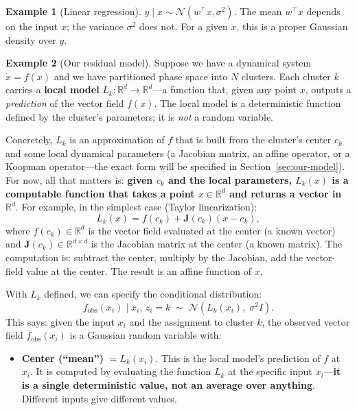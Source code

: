 \documentclass[11pt]{article}
\theoremstyle{definition}
\newtheorem{example}{Example}[section]
\theoremstyle{plain}
\theoremstyle{remark}
\newcommand{\R}{\mathbb{R}}
\newcommand{\Jv}{\boldsymbol{J}}
\begin{document}
\begin{example}[Linear regression]
$y\mid x \sim \mathcal{N}(w^\top x, \sigma^2)$. The mean $w^\top x$ depends on the input $x$; the variance $\sigma^2$ does not. For a given $x$, this is a proper Gaussian density over $y$.
\end{example}

\begin{example}[Our residual model]
Suppose we have a dynamical system $\dot{x}=f(x)$ and we have partitioned phase space into $N$ clusters. Each cluster $k$ carries a \textbf{local model} $L_k\colon\R^d\to\R^d$---a function that, given any point $x$, outputs a \emph{prediction} of the vector field $f(x)$. The local model is a deterministic function defined by the cluster's parameters; it is \emph{not} a random variable.

Concretely, $L_k$ is an approximation of $f$ that is built from the cluster's center $c_k$ and some local dynamical parameters (a Jacobian matrix, an affine operator, or a Koopman operator---the exact form will be specified in Section~\ref{sec:our-model}). For now, all that matters is: \textbf{given $c_k$ and the local parameters, $L_k(x)$ is a computable function that takes a point $x\in\R^d$ and returns a vector in $\R^d$}. For example, in the simplest case (Taylor linearization):
\begin{equation}
  L_k(x) = f(c_k) + \Jv(c_k)(x - c_k),
\end{equation}
where $f(c_k)\in\R^d$ is the vector field evaluated at the center (a known vector) and $\Jv(c_k)\in\R^{d\times d}$ is the Jacobian matrix at the center (a known matrix). The computation is: subtract the center, multiply by the Jacobian, add the vector-field value at the center. The result is an affine function of $x$.

With $L_k$ defined, we can specify the conditional distribution:
\begin{equation}
  f_{\mathrm{obs}}(x_i) \mid x_i,\, z_i=k \;\sim\; \mathcal{N}(L_k(x_i),\;\sigma^2 I).
\end{equation}
This says: given the input $x_i$ and the assignment to cluster $k$, the observed vector field $f_{\mathrm{obs}}(x_i)$ is a Gaussian random variable with:
\begin{itemize}[leftmargin=*,itemsep=2pt]
  \item \textbf{Center (``mean'')} $= L_k(x_i)$. This is the local model's prediction of $f$ at $x_i$. It is computed by evaluating the function $L_k$ at the specific input $x_i$---\textbf{it is a single deterministic value, not an average over anything}. Different inputs give different values.


\end{itemize}
\end{example}
\end{document}
